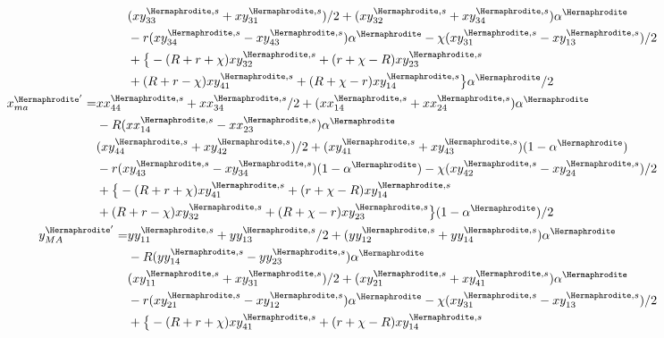 \documentclass[12pt]{article}
\begin{document}
\begin{subequations}
\begin{align}
\begin{split}
&(xy_{33}^{\Hermaphrodite,s}+xy_{31}^{\Hermaphrodite,s})/2+(xy_{32}^{\Hermaphrodite,s}+xy_{34}^{\Hermaphrodite,s})\alpha^\Hermaphrodite\\
&- r(xy_{34}^{\Hermaphrodite,s}-xy_{43}^{\Hermaphrodite,s}) \alpha^\Hermaphrodite - \chi(xy_{31}^{\Hermaphrodite,s}-xy_{13}^{\Hermaphrodite,s})/2\\
&+\big{\{}-(R+r+\chi)xy_{32}^{\Hermaphrodite,s} +(r+\chi-R)xy_{23}^{\Hermaphrodite,s}\\
&+(R+r-\chi) xy_{41}^{\Hermaphrodite,s}+(R+\chi-r)xy_{14}^{\Hermaphrodite,s}\big{\}} \alpha^\Hermaphrodite/2
\end{split}
\\
%
\begin{split}
x_{ma}^{{\Hermaphrodite}'}=&xx_{44}^{\Hermaphrodite,s}+xx_{34}^{\Hermaphrodite,s}/2+(xx_{14}^{\Hermaphrodite,s}+xx_{24}^{\Hermaphrodite,s})\alpha^\Hermaphrodite\\
&-R(xx_{14}^{\Hermaphrodite,s}-xx_{23}^{\Hermaphrodite,s}) \alpha^\Hermaphrodite\\
&(xy_{44}^{\Hermaphrodite,s}+xy_{42}^{\Hermaphrodite,s})/2+(xy_{41}^{\Hermaphrodite,s}+xy_{43}^{\Hermaphrodite,s})(1-\alpha^\Hermaphrodite)\\
&- r(xy_{43}^{\Hermaphrodite,s}-xy_{34}^{\Hermaphrodite,s})(1-\alpha^\Hermaphrodite) - \chi(xy_{42}^{\Hermaphrodite,s}-xy_{24}^{\Hermaphrodite,s})/2\\
&+\big{\{}-(R+r+\chi)xy_{41}^{\Hermaphrodite,s}+(r+\chi-R)xy_{14}^{\Hermaphrodite,s}\\
&+(R+r-\chi) xy_{32}^{\Hermaphrodite,s}+(R+\chi-r)xy_{23}^{\Hermaphrodite,s}\big{\}}(1-\alpha^\Hermaphrodite)/2
\end{split}
\\
\begin{split}
y_{MA}^{{\Hermaphrodite}'}=&yy_{11}^{\Hermaphrodite,s}+yy_{13}^{\Hermaphrodite,s}/2+(yy_{12}^{\Hermaphrodite,s}+yy_{14}^{\Hermaphrodite,s})\alpha^\Hermaphrodite\\
&-R(yy_{14}^{\Hermaphrodite,s}-yy_{23}^{\Hermaphrodite,s}) \alpha^\Hermaphrodite\\
&(xy_{11}^{\Hermaphrodite,s}+xy_{31}^{\Hermaphrodite,s})/2+(xy_{21}^{\Hermaphrodite,s}+xy_{41}^{\Hermaphrodite,s})\alpha^\Hermaphrodite\\
&- r(xy_{21}^{\Hermaphrodite,s}-xy_{12}^{\Hermaphrodite,s})\alpha^\Hermaphrodite - \chi(xy_{31}^{\Hermaphrodite,s}-xy_{13}^{\Hermaphrodite,s})/2\\
&+\big{\{} - (R+r+\chi)xy_{41}^{\Hermaphrodite,s} + (r+\chi-R)xy_{14}^{\Hermaphrodite,s}\\

\end{split}
\end{align}
\end{subequations}
\end{document}
